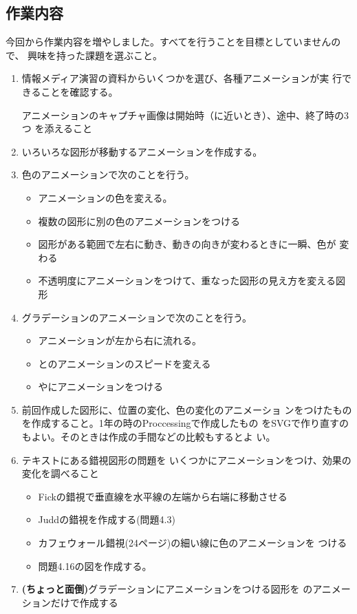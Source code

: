 \documentclass[a4j]{jarticle}
\begin{document}
\subsection{作業内容}
今回から作業内容を増やしました。すべてを行うことを目標としていませんので、
興味を持った課題を選ぶこと。%
\begin{enumerate}
 \item 情報メディア演習の資料からいくつかを選び、各種アニメーションが実
       行できることを確認する。

アニメーションのキャプチャ画像は開始時（に近いとき）、途中、終了時の3つ
       を添えること
 \item いろいろな図形が移動するアニメーションを作成する。
 \item 色のアニメーションで次のことを行う。
\begin{itemize}
  \item アニメーションの色を変える。
  \item 複数の図形に別の色のアニメーションをつける
   \item 図形がある範囲で左右に動き、動きの向きが変わるときに一瞬、色が
         変わる
 \item 不透明度にアニメーションをつけて、重なった図形の見え方を変える図
       形
\end{itemize}
 \item グラデーションのアニメーションで次のことを行う。
       \begin{itemize}
         \item アニメーションが左から右に流れる。
        \item {}とのアニメーションのスピードを変える
        \item {}やにアニメーションをつける
       \end{itemize}
 \item 前回作成した図形に、位置の変化、色の変化のアニメーショ
       ンをつけたものを作成すること。1年の時のProccessingで作成したもの
       をSVGで作り直すのもよい。そのときは作成の手間などの比較もするとよ
       い。
 \item テキストにある錯視図形の問題を
       いくつかにアニメーションをつけ、効果の変化を調べること
       \begin{itemize}
        \item Fickの錯視で垂直線を水平線の左端から右端に移動させる
        \item Juddの錯視を作成する(問題4.3)
        \item カフェウォール錯視(24ページ)の細い線に色のアニメーションを
              つける
        \item 問題4.16の図を作成する。
       \end{itemize}
 \item {\bfseries (ちょっと面倒)}グラデーションにアニメーションをつける図形を
       のアニメーションだけで作成する
\end{enumerate}
\end{document}
